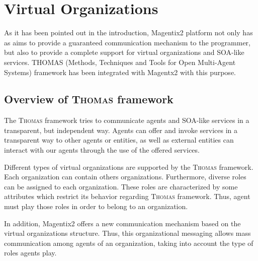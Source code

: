 \chapter{Virtual Organizations}\label{chap:VirtualOrganizations}
As it has been pointed out in the introduction, Magentix2 platform not only has as aims to provide a guaranteed communication mechanism to the programmer, but also to provide a complete support for virtual organizations and SOA-like services. \textsc{THOMAS} (Methods, Techniques and Tools for Open Multi-Agent Systems) framework has been integrated with Magentx2 with this purpose.

\section{Overview of \textsc{Thomas} framework}

The \textsc{Thomas} framework tries to communicate agents and SOA-like services in a transparent, but independent way.  Agents can offer and invoke services in a transparent way to other agents or entities, as well as external entities can interact with our agents through the use of the offered services. 


Different types of virtual organizations are supported by the \textsc{Thomas} framework. Each organization can contain others organizations. Furthermore, diverse roles can be assigned to each organization. These roles are characterized by some attributes which restrict its behavior regarding \textsc{Thomas} framework. Thus, agent must play those roles in order to belong to an organization.   

In addition, Magentix2 offers a new communication mechanism based on the virtual organizations structure. Thus, this organizational messaging allows mass communication among agents of an organization, taking into account the type of roles agents play.


